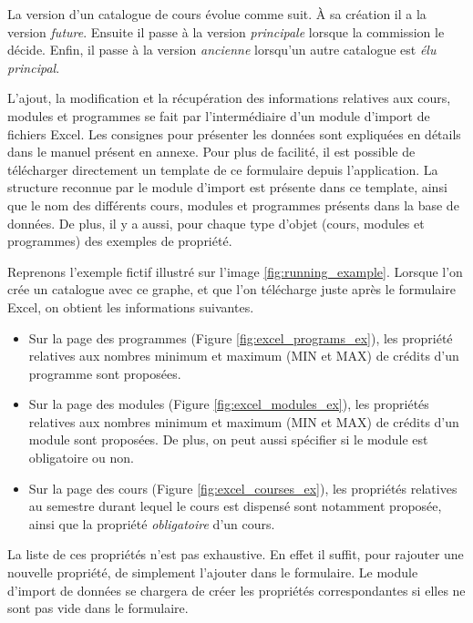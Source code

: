 \label{catalog_version}
La version d'un catalogue de cours évolue comme suit. À sa création il a la version \textit{future}. Ensuite il passe à la version \textit{principale} lorsque la commission le décide. Enfin, il passe à la version \textit{ancienne} lorsqu'un autre catalogue est \textit{élu} \textit{principal}. 

L'ajout, la modification et la récupération des informations relatives aux cours, modules et programmes se fait par l'intermédiaire d'un module d'import de fichiers Excel. Les consignes pour présenter les données sont expliquées en détails dans le manuel présent en annexe. Pour plus de facilité, il est possible de télécharger directement un template de ce formulaire depuis l'application. La structure reconnue par le module d'import est présente dans ce template, ainsi que le nom des différents cours, modules et programmes présents dans la base de données. De plus, il y a aussi, pour chaque type d'objet (cours, modules et programmes) des exemples de propriété. 

Reprenons l'exemple fictif illustré sur l'image \ref{fig:running_example}. Lorsque l'on crée un catalogue avec ce graphe, et que l'on télécharge juste après le formulaire Excel, on obtient les informations suivantes.

\begin{itemize}

\item Sur la page des programmes (Figure \ref{fig:excel_programs_ex}), les propriété relatives aux nombres minimum et maximum (MIN et MAX) de crédits d'un programme sont proposées.

\item Sur la page des modules (Figure \ref{fig:excel_modules_ex}), les propriétés relatives aux nombres minimum et maximum (MIN et MAX) de crédits d'un module sont proposées. De plus, on peut aussi spécifier si le module est obligatoire ou non.

\item Sur la page des cours (Figure \ref{fig:excel_courses_ex}), les propriétés relatives au semestre durant lequel le cours est dispensé sont notamment proposée, ainsi que la propriété \textit{obligatoire} d'un cours. 

\end{itemize}

La liste de ces propriétés n'est pas exhaustive. En effet il suffit, pour rajouter une nouvelle propriété, de simplement l'ajouter dans le formulaire. Le module d'import de données se chargera de créer les propriétés correspondantes si elles ne sont pas vide dans le formulaire. 

